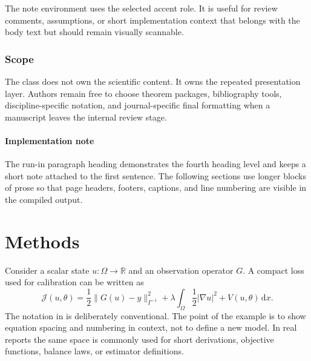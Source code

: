 \documentclass[\oritoneexamplemode,11pt]{oritone-manuscript}
\begin{document}
\begin{oritonenote}
The note environment uses the selected accent role. It is useful for review
comments, assumptions, or short implementation context that belongs with the
body text but should remain visually scannable.
\end{oritonenote}

\subsubsection{Scope}

The class does not own the scientific content. It owns the repeated
presentation layer. Authors remain free to choose theorem packages,
bibliography tools, discipline-specific notation, and journal-specific final
formatting when a manuscript leaves the internal review stage.

\paragraph{Implementation note}
The run-in paragraph heading demonstrates the fourth heading level and keeps a
short note attached to the first sentence. The following sections use longer
blocks of prose so that page headers, footers, captions, and line numbering are
visible in the compiled output.

\section{Methods}
\label{sec:methods}

Consider a scalar state \(u:\Omega\to\mathbb{R}\) and an observation operator
\(G\). A compact loss used for calibration can be written as
\begin{equation}
  \mathcal{J}(u,\theta)
  =
  \frac{1}{2}\lVert G(u)-y\rVert_{\Gamma^{-1}}^2
  + \lambda \int_{\Omega}
      \frac{1}{2}\lvert\nabla u\rvert^2 + V(u,\theta)\,\mathrm{d}x .
  \label{eq:objective}
\end{equation}
The notation in  is deliberately conventional. The point of
the example is to show equation spacing and numbering in context, not to define
a new model. In real reports the same space is commonly used for short
derivations, objective functions, balance laws, or estimator definitions.
\end{document}
